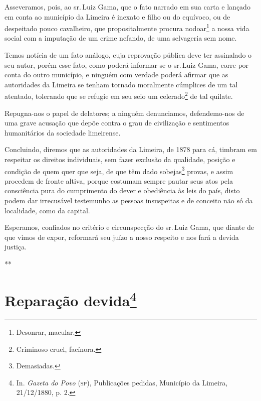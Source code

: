 {Asseveramos, pois, ao sr.\,Luiz Gama, que o fato narrado em sua carta e
lançado em conta ao município da Limeira é inexato e filho ou do
equívoco, ou de despeitado pouco cavalheiro, que propositalmente procura
nodoar\footnote{Desonrar, macular.} a nossa vida social com a
imputação de um crime nefando, de uma selvageria sem nome.

Temos notícia de um fato análogo, cuja reprovação pública deve ter
assinalado o seu autor, porém esse fato, como poderá informar-se o sr.\,Luiz Gama, corre por conta do outro município, e ninguém com verdade
poderá afirmar que as autoridades da Limeira se tenham tornado
moralmente cúmplices de um tal atentado, tolerando que se refugie em seu
seio um celerado\footnote{Criminoso cruel, facínora.} de tal quilate.

Repugna-nos o papel de delatores; a ninguém denunciamos, defendemo-nos
de uma grave acusação que depõe contra o grau de civilização e
sentimentos humanitários da sociedade limeirense.

Concluindo, diremos que as autoridades da Limeira, de 1878 para cá,
timbram em respeitar os direitos individuais, sem fazer exclusão da
qualidade, posição e condição de quem quer que seja, de que têm dado
sobejas\footnote{Demasiadas.} provas, e assim procedem de fronte
altiva, porque costumam sempre pautar seus atos pela consciência pura do
cumprimento do dever e obediência às leis do país, disto podem dar
irrecusável testemunho as pessoas insuspeitas e de conceito não só da
localidade, como da capital.

Esperamos, confiados no critério e circunspecção do sr.\,Luiz Gama, que
diante de que vimos de expor, reformará seu juízo a nosso respeito e nos
fará a devida justiça.

\medskip

\hfill***
\pagebreak
\section{Reparação devida\protect\footnote{\MakeUppercase{I}n. \emph{\MakeUppercase{G}azeta do \MakeUppercase{P}ovo} (\textsc{sp}),
  \MakeUppercase{P}ublicações pedidas, \MakeUppercase{M}unicípio da \MakeUppercase{L}imeira, 21/12/1880, p. 2.}}

}
